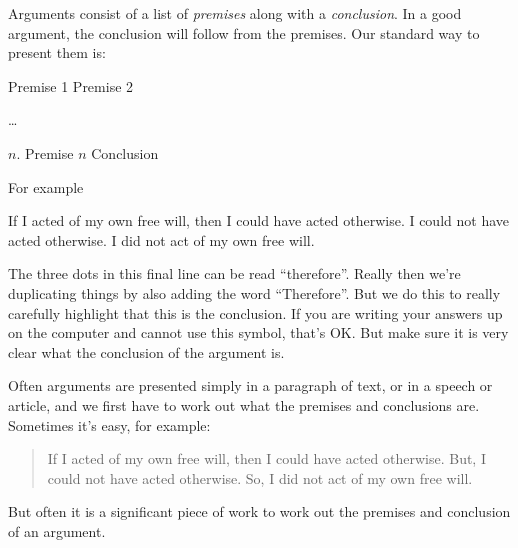 Arguments consist of a list of \emph{premises} along with a \emph{conclusion}. In a good argument, the conclusion will follow from the premises.
Our standard way to present them is:
\begin{earg}
\prem Premise 1
\prem Premise 2
\item[] \dots
\item[$n$.] Premise $n$
\conc Conclusion
\end{earg}
For	example
	\begin{earg}
	\prem If I acted of my own free will, then I could have acted otherwise.
	\prem I could not have acted otherwise.
	\conc I did not act of my own free will.
	\end{earg}

The three dots in this final line can be read ``therefore''. Really then we're duplicating things by also adding the word ``Therefore''. But we do this to really carefully highlight that this is the conclusion. If you are writing your answers up on the computer and cannot use this symbol, that's OK. But make sure it is very clear what the conclusion of the argument is. 


Often arguments are presented simply in a paragraph of text, or in a speech or article, and we first have to work out what the premises and conclusions are.
Sometimes it's easy, for example:
\begin{quote}
	If I acted of my own free will, then I could have acted otherwise.
	But, I could not have acted otherwise.
	So, I did not act of my own free will.
\end{quote}
But often it is a significant piece of work to work out the premises and conclusion of an argument.





